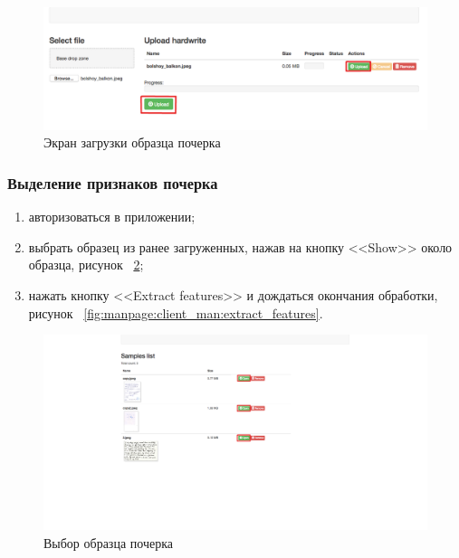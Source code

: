 \begin{figure}[ht]
    \centering
    \label{fig:manpage:client_man:upload_sample}
    \includegraphics[width=0.6\textheight]{figures/upload_sample_man.png}
    \caption{Экран загрузки образца почерка}
    \label{fig:manpage:client_man:upload_sample}
\end{figure}

\subsubsection{Выделение признаков почерка}
\label{sec:manpage:client_man:features}
\begin{enumerate}
    \item[1)] авторизоваться в приложении;
    \item[2)] выбрать образец из ранее загруженных, нажав на кнопку <<Show>> около образца, рисунок ~\ref{fig:manpage:client_man:show_button};
    \item[3)] нажать кнопку <<Extract features>> и дождаться окончания обработки, рисунок ~\ref{fig:manpage:client_man:extract_features}.
\end{enumerate}

\begin{figure}[ht]
    \centering
    \includegraphics[width=0.6\textheight]{figures/samples_open.png}
    \caption{Выбор образца почерка}
    \label{fig:manpage:client_man:show_button}
\end{figure}

